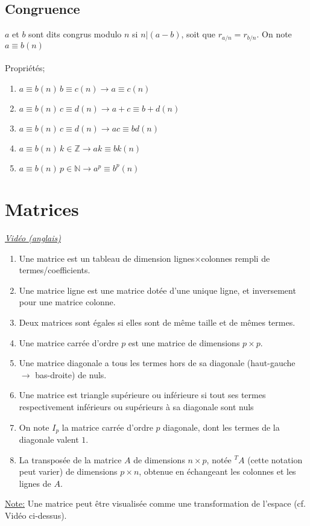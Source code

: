 \documentclass{article}
\begin{document}
\subsection{Congruence}
$a$ et $b$ sont dits congrus modulo $n$ si $n|(a-b)$, soit que $r_{a/n}=r_{b/n}$. On note $a\equiv b (n)$
\\\\Propriétés;
\begin{enumerate}
	\item $a \equiv b(n)\,b\equiv c(n) \rightarrow a\equiv c(n)$
	\item $a \equiv b(n)\,c \equiv d(n) \rightarrow a+c\equiv b+d(n)$
	\item $a \equiv b(n)\,c \equiv d(n) \rightarrow ac\equiv bd(n)$
	\item $a \equiv b(n)\,k\in\mathbb{Z} \rightarrow ak\equiv bk(n)$
	\item $a \equiv b(n)\,p\in\mathbb{N} \rightarrow a^p\equiv b^p(n)$
\end{enumerate}


\section{Matrices}
\href{https://youtu.be/kYB8IZa5AuEl}{\underline{\textit{Vidéo (anglais)}}}\\
\break
\begin{enumerate}
	\item Une matrice est un tableau de dimension lignes$\times$colonnes rempli de termes/coefficients.
	\item Une matrice ligne est une matrice dotée d'une unique ligne, et inversement pour une matrice colonne.
	\item Deux matrices sont égales si elles sont de même taille et de mêmes termes.
	\item Une matrice carrée d'ordre $p$ est une matrice de dimensions $p\times p$.
	\item Une matrice diagonale a tous les termes hors de sa diagonale (haut-gauche $\rightarrow$ bas-droite) de nuls.
	\item Une matrice est triangle supérieure ou inférieure si tout ses termes respectivement inférieurs ou supérieurs à sa diagonale sont nuls
	\item On note $I_p$ la matrice carrée d'ordre $p$ diagonale, dont les termes de la diagonale valent $1$.
	\item La transposée de la matrice $A$ de dimensions $n\times p$, notée $^TA$ (cette notation peut varier) de dimensions $p\times n$, obtenue en échangeant les colonnes et les lignes de $A$.
\end{enumerate}
\underline{Note:} Une matrice peut être visualisée comme une transformation de l'espace (cf. Vidéo ci-dessus).
\end{document}
